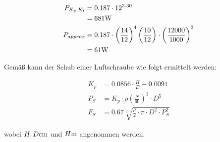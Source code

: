 \begin{align}
	P_{K_p,K_t} &= 0.187 \cdot 12^{3.30} \\ &= 681 \si{\watt} \notag\\
	P_{approx} &= 0.187 \cdot \left(\frac{14}{12}\right)^4 \left(\frac{10}{12}\right) \cdot \left(\frac{12000}{1000}\right)^3 \\ &= 61 \si{\watt} \notag
\end{align}

\bigbreak

Gemäß \cite{standschub} kann der Schub einer Luftschraube wie folgt ermittelt werden:

\begin{align}
	K_p &= 0.0856 \cdot \frac{H}{D} - 0.0091 \\
	P_S &= K_p \cdot \rho \left(\frac{N}{60}\right)^3 \cdot D^5 \\
	F_S &= 0.67 \sqrt[3]{\frac{\rho}{2}\cdot\pi \cdot D^2 \cdot P_S^2}
\end{align}

wobei $H,D \withunit{\centi\meter}$ und $H \withunit{\meter}$ angenommen werden.

